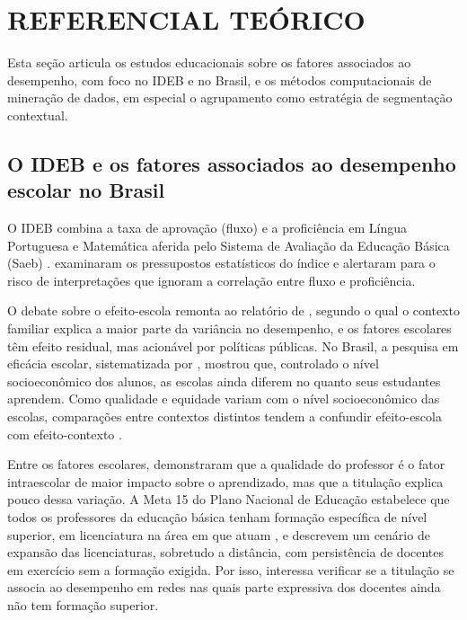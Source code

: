 \section{REFERENCIAL TEÓRICO}
\label{sec:referencial}

Esta seção articula os estudos educacionais sobre os fatores associados ao desempenho, com foco no IDEB e no Brasil, e os métodos computacionais de mineração de dados, em especial o agrupamento como estratégia de segmentação contextual.

\subsection{O IDEB e os fatores associados ao desempenho escolar no Brasil}

O IDEB combina a taxa de aprovação (fluxo) e a proficiência em Língua Portuguesa e Matemática aferida pelo Sistema de Avaliação da Educação Básica (Saeb) \parencite{fernandes2007}. \textcite{soares2013} examinaram os pressupostos estatísticos do índice e alertaram para o risco de interpretações que ignoram a correlação entre fluxo e proficiência.

O debate sobre o efeito-escola remonta ao relatório de \textcite{coleman1966}, segundo o qual o contexto familiar explica a maior parte da variância no desempenho, e os fatores escolares têm efeito residual, mas acionável por políticas públicas. No Brasil, a pesquisa em eficácia escolar, sistematizada por \textcite{brooke2008}, mostrou que, controlado o nível socioeconômico dos alunos, as escolas ainda diferem no quanto seus estudantes aprendem. Como qualidade e equidade variam com o nível socioeconômico das escolas, comparações entre contextos distintos tendem a confundir efeito-escola com efeito-contexto \parencite{albernaz2002}.

Entre os fatores escolares, \textcite{rivkin2005} demonstraram que a qualidade do professor é o fator intraescolar de maior impacto sobre o aprendizado, mas que a titulação explica pouco dessa variação. A Meta 15 do Plano Nacional de Educação estabelece que todos os professores da educação básica tenham formação específica de nível superior, em licenciatura na área em que atuam \parencite{brasil2014}, e \textcite{gatti2019} descrevem um cenário de expansão das licenciaturas, sobretudo a distância, com persistência de docentes em exercício sem a formação exigida. Por isso, interessa verificar se a titulação se associa ao desempenho em redes nas quais parte expressiva dos docentes ainda não tem formação superior.

